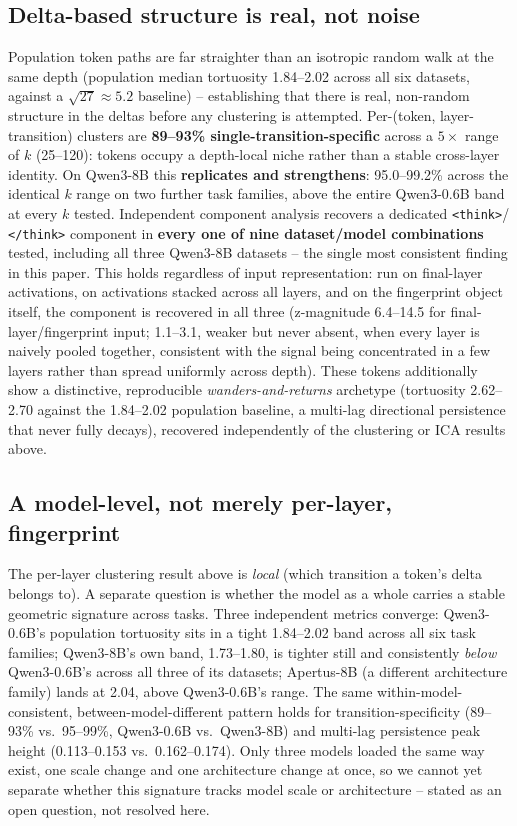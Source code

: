 \documentclass{article}
\theoremstyle{plain}
\theoremstyle{definition}
\theoremstyle{remark}
\begin{document}
\subsection{Delta-based structure is real, not noise}
\label{sec:results:structure}

Population token paths are far straighter than an isotropic random walk at the same
depth (population median tortuosity 1.84--2.02 across all six datasets, against a
$\sqrt{27}\approx5.2$ baseline) -- establishing that there is real, non-random structure
in the deltas before any clustering is attempted. Per-(token, layer-transition) clusters
are \textbf{89--93\% single-transition-specific} across a $5\times$ range of $k$
(25--120): tokens occupy a depth-local niche rather than a stable cross-layer identity.
On Qwen3-8B this \textbf{replicates and strengthens}: 95.0--99.2\% across the identical
$k$ range on two further task families, above the entire Qwen3-0.6B band at every $k$
tested. Independent component analysis recovers a dedicated \texttt{<think>}/
\texttt{</think>} component in \textbf{every one of nine dataset/model combinations}
tested, including all three Qwen3-8B datasets -- the single most consistent finding in
this paper. This holds regardless of input representation: run on final-layer
activations, on activations stacked across all layers, and on the fingerprint object
itself, the component is recovered in all three (z-magnitude 6.4--14.5 for
final-layer/fingerprint input; 1.1--3.1, weaker but never absent, when every layer is
naively pooled together, consistent with the signal being concentrated in a few layers
rather than spread uniformly across depth). These tokens additionally show a distinctive,
reproducible \emph{wanders-and-returns} archetype (tortuosity 2.62--2.70 against the
1.84--2.02 population baseline, a multi-lag directional persistence that never fully
decays), recovered independently of the clustering or ICA results above.

\subsection{A model-level, not merely per-layer, fingerprint}
\label{sec:results:modelfingerprint}

The per-layer clustering result above is \emph{local} (which transition a token's delta
belongs to). A separate question is whether the model as a whole carries a stable
geometric signature across tasks. Three independent metrics converge: Qwen3-0.6B's
population tortuosity sits in a tight 1.84--2.02 band across all six task families;
Qwen3-8B's own band, 1.73--1.80, is tighter still and consistently \emph{below}
Qwen3-0.6B's across all three of its datasets; Apertus-8B (a different architecture
family) lands at 2.04, above Qwen3-0.6B's range. The same within-model-consistent,
between-model-different pattern holds for transition-specificity (89--93\% vs.\
95--99\%, Qwen3-0.6B vs.\ Qwen3-8B) and multi-lag persistence peak height
(0.113--0.153 vs.\ 0.162--0.174). Only three models loaded the same way exist, one scale
change and one architecture change at once, so we cannot yet separate whether this
signature tracks model scale or architecture -- stated as an open question, not resolved
here.
\end{document}
